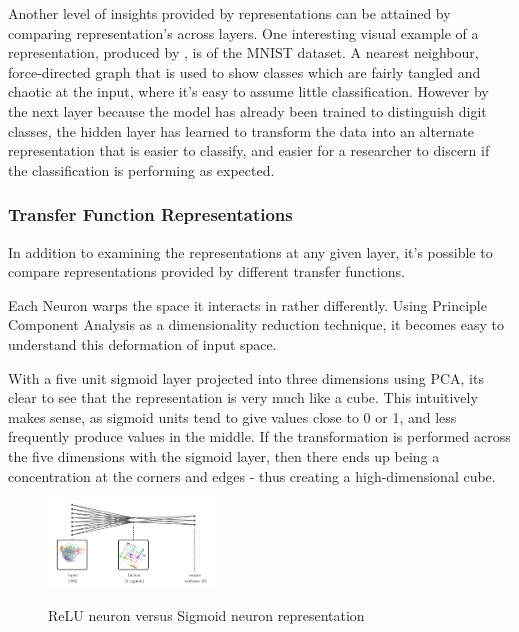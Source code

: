 \documentclass[a4paper,11pt,titlepage]{article}
\begin{document}
		Another level of insights provided by representations can be attained by comparing representation's across layers. One interesting visual example of a representation, produced by \cite{Olah2014}, is of the MNIST dataset. A nearest neighbour, force-directed graph that is used to show classes which are fairly tangled and chaotic at the input, where it's easy to assume little classification. However by the next layer because the model has already been trained to distinguish digit classes, the hidden layer has learned to transform the data into an alternate representation that is easier to classify, and easier for a researcher to discern if the classification is performing as expected.				
		\par 
	
		\subsubsection{Transfer Function Representations}
		In addition to examining the representations at any given layer, it's possible to compare representations provided by different transfer functions. 
		\par 
		Each Neuron warps the space it interacts in rather differently. Using Principle Component Analysis as a dimensionality reduction technique, it becomes easy to understand this deformation of input space.
		\par 
		With a five unit sigmoid layer projected into three dimensions using PCA, its clear to see that the representation is very much like a cube. This intuitively makes sense, as sigmoid units tend to give values close to 0 or 1, and less frequently produce values in the middle. If the transformation is performed across the five dimensions with the sigmoid layer, then there ends up being a concentration at the corners and edges - thus creating a high-dimensional cube. 
		\par 
		
		\begin{figure}[H]
    			\qquad
    			{{\includegraphics[width=0.4\textwidth]
    				{img/colah_sigmoid.png} 
    			}}%
    			\caption{ReLU neuron versus Sigmoid neuron representation}%
		\end{figure}
 		
\end{document}
